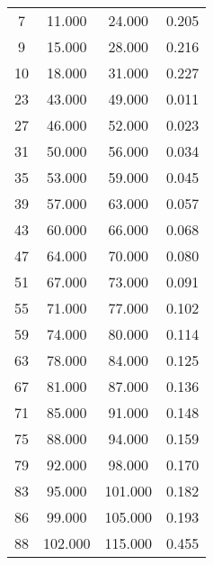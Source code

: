 % 
\begin{tabular}{cccc}
  \hline
  \hline
7 & 11.000 & 24.000 & 0.205 \\ 
  9 & 15.000 & 28.000 & 0.216 \\ 
  10 & 18.000 & 31.000 & 0.227 \\ 
  23 & 43.000 & 49.000 & 0.011 \\ 
  27 & 46.000 & 52.000 & 0.023 \\ 
  31 & 50.000 & 56.000 & 0.034 \\ 
  35 & 53.000 & 59.000 & 0.045 \\ 
  39 & 57.000 & 63.000 & 0.057 \\ 
  43 & 60.000 & 66.000 & 0.068 \\ 
  47 & 64.000 & 70.000 & 0.080 \\ 
  51 & 67.000 & 73.000 & 0.091 \\ 
  55 & 71.000 & 77.000 & 0.102 \\ 
  59 & 74.000 & 80.000 & 0.114 \\ 
  63 & 78.000 & 84.000 & 0.125 \\ 
  67 & 81.000 & 87.000 & 0.136 \\ 
  71 & 85.000 & 91.000 & 0.148 \\ 
  75 & 88.000 & 94.000 & 0.159 \\ 
  79 & 92.000 & 98.000 & 0.170 \\ 
  83 & 95.000 & 101.000 & 0.182 \\ 
  86 & 99.000 & 105.000 & 0.193 \\ 
  88 & 102.000 & 115.000 & 0.455 \\ 
   \hline
\end{tabular}

